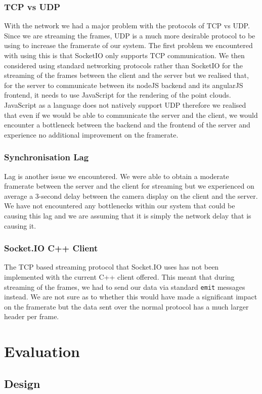 \documentclass{article}
\begin{document}
\subsubsection{TCP vs UDP}
With the network we had a major problem with the protocols of TCP vs UDP. Since we are streaming the frames, UDP is a much more desirable protocol to be using to increase the framerate of our system. The first problem we encountered with using this is that SocketIO only supports TCP communication. We then considered using standard networking protocols rather than SocketIO for the streaming of the frames between the client and the server but we realised that, for the server to communicate between its nodeJS backend and its angularJS frontend, it needs to use JavaScript for the rendering of the point clouds. JavaScript as a language does not natively support UDP therefore we realised that even if we would be able to communicate the server and the client, we would encounter a bottleneck between the backend and the frontend of the server and experience no additional improvement on the framerate.
\subsubsection{Synchronisation Lag}
Lag is another issue we encountered. We were able to obtain a moderate framerate between the server and the client for streaming but we experienced on average a 3-second delay between the camera display on the client and the server. We have not encountered any bottlenecks within our system that could be causing this lag and we are assuming that it is simply the network delay that is causing it.
\subsubsection{Socket.IO C++ Client}
The TCP based streaming protocol that Socket.IO uses has not been implemented with the current C++ client offered.
This meant that during streaming of the frames, we had to send our data via standard \texttt{emit} messages instead. We are not sure as to whether this would have made a significant impact on the framerate but the data sent over the normal protocol has a much larger header per frame.

\newpage
\section{Evaluation}
\subsection{Design}
\end{document}
